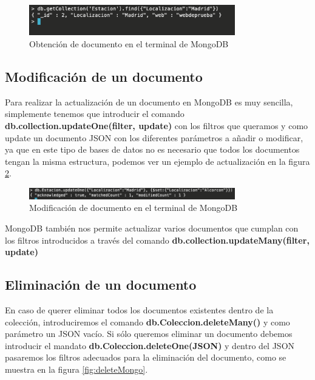 \begin{figure}[h]
    \centering
    \includegraphics[width=0.8\textwidth]{include/resultados/FindMongo.png}
    \caption{Obtención de documento en el terminal de MongoDB}
    \label{fig:findMongo}
\end{figure}


\subsection{Modificación de un documento}

Para realizar la actualización de un documento en MongoDB es muy sencilla, simplemente tenemos que introducir el comando \textbf{db.collection.updateOne(filter, update)} con los filtros que queramos y como update un documento JSON con los diferentes parámetros a añadir o modificar, ya que en este tipo de bases de datos no es necesario que todos los documentos tengan la misma estructura, podemos ver un ejemplo de actualización en la figura \ref{fig:update_Mongo}.

\begin{figure}[h]
    \centering
    \includegraphics[width=0.8\textwidth]{include/resultados/UpdateMongo.png}
    \caption{Modificación de documento en el terminal de MongoDB}
    \label{fig:update_Mongo}
\end{figure}


MongoDB también nos permite actualizar varios documentos que cumplan con los filtros introducidos a través del comando \textbf{db.collection.updateMany(filter, update)}

\subsection{Eliminación de un documento}

En caso de querer eliminar todos los documentos existentes dentro de la colección, introduciremos el comando \textbf{db.Coleccion.deleteMany({})} y como parámetro un JSON vacío. Si sólo queremos eliminar un documento debemos introducir el mandato \textbf{db.Coleccion.deleteOne({JSON})} y dentro del JSON pasaremos los filtros adecuados para la eliminación del documento, como se muestra en la figura \ref{fig:deleteMongo}.

